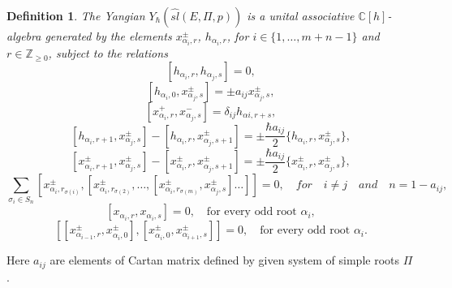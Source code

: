 \documentclass[english]{elsarticle}
\newtheorem{definition}{Definition}[section]
\numberwithin{equation}{section}
\begin{document}
\begin{definition}
The Yangian $Y_\hbar(\hat{sl}(E,\Pi,p))$ is a unital associative $\mathbb{C}[h]$-algebra generated by the elements $x_{\alpha_{i},r}^{\pm}$, $h_{\alpha_{i},r}$, for $i \in \{1,\ldots,m+n-1 \}$ and $r \in \mathbb{Z}_{\geq 0}$, subject to the relations
\begin{equation}
\label{rel:27}
    [h_{\alpha_{i},r}, h_{\alpha_{j},s}] = 0,
\end{equation}
\begin{equation}
\label{rel:28}
    [h_{\alpha_{i},0},x_{\alpha_{j},s}^{\pm}]=\pm a_{ij}x_{\alpha_{j},s}^{\pm},
\end{equation}
\begin{equation}
\label{rel:29}
    [x_{\alpha_{i},r}^{+},x_{\alpha_{j},s}^{-}]=\delta_{ij}h_{\alpha{i},r+s},
\end{equation}
\begin{equation}
\label{rel:30}
    [h_{\alpha_{i},r+1},x_{\alpha_{j},s}^{\pm}]-[h_{\alpha_{i},r},x_{\alpha_{j},s+1}^{\pm}]=\pm\frac{\hbar a_{ij}}{2}\{h_{\alpha_{i},r},x_{\alpha_{j},s}^{\pm}\},
\end{equation}
\begin{equation}
\label{rel:31}
    [x_{\alpha_{i},r+1}^{\pm},x_{\alpha_{j},s}^{\pm}]-[x_{\alpha_{i},r}^{\pm},x_{\alpha_{j},s+1}^{\pm}]=\pm \frac{ \hbar a_{ij}}{2}\{x_{\alpha_{i},r}^{\pm},x_{\alpha_{j},s}^{\pm}\},
\end{equation}
\begin{equation}
\label{rel:32}
\sum\limits_{\sigma_i \in S_n}[x_{\alpha_{i},r_{\sigma(i)}}^{\pm},[x_{\alpha_{i},r_{\sigma(2)}}^{\pm},\ldots,[x_{\alpha_{i},r_{\sigma(m)}}^{\pm},x_{\alpha_{j},s}^{\pm}]\ldots]]=0, \quad for \quad i\neq j \quad and \quad n=1-a_{ij},
\end{equation}
\begin{equation}
\label{rel:33}
  [x_{\alpha_{i},r},x_{\alpha_{i},s}]=0, \quad \text{for every odd root $\alpha_i$},
\end{equation}
\begin{equation}
\label{rel:34}
[[x_{\alpha_{i-1},r}^{\pm},x_{\alpha_{i},0}^{\pm}],[x_{\alpha_{i},0}^{\pm},x_{\alpha_{i+1},s}^{\pm}]]=0, \quad \text{for every odd root $\alpha_i$}.
\end{equation}
\end{definition}
Here $a_{ij}$ are elements of Cartan matrix defined by given system of simple roots $\Pi$.
\end{document}

